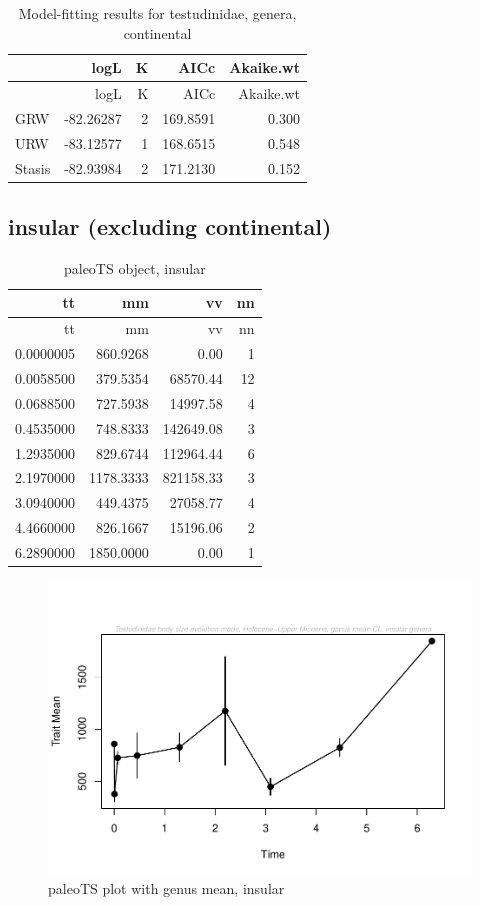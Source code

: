 \begin{longtable}[]{@{}lrrrr@{}}
	\caption{Model-fitting results for testudinidae, genera,
		continental}
	\label{tab:pTSCEM}\tabularnewline
	\toprule
	& logL & K & AICc & Akaike.wt\tabularnewline
	\midrule
	\endfirsthead
	\toprule
	& logL & K & AICc & Akaike.wt\tabularnewline
	\midrule
	\endhead
	GRW & -82.26287 & 2 & 169.8591 & 0.300\tabularnewline
	URW & -83.12577 & 1 & 168.6515 & 0.548\tabularnewline
	Stasis & -82.93984 & 2 & 171.2130 & 0.152\tabularnewline
	\bottomrule
\end{longtable}


\FloatBarrier

\subsection{insular (excluding
	continental)}\label{insular-excluding-continental}


\begin{longtable}[]{@{}rrrr@{}}
	\caption{paleoTS object, insular}
	\label{tab:pTSI}\tabularnewline
	\toprule
	tt & mm & vv & nn\tabularnewline
	\midrule
	\endfirsthead
	\toprule
	tt & mm & vv & nn\tabularnewline
	\midrule
	\endhead
	0.0000005 & 860.9268 & 0.00 & 1\tabularnewline
	0.0058500 & 379.5354 & 68570.44 & 12\tabularnewline
	0.0688500 & 727.5938 & 14997.58 & 4\tabularnewline
	0.4535000 & 748.8333 & 142649.08 & 3\tabularnewline
	1.2935000 & 829.6744 & 112964.44 & 6\tabularnewline
	2.1970000 & 1178.3333 & 821158.33 & 3\tabularnewline
	3.0940000 & 449.4375 & 27058.77 & 4\tabularnewline
	4.4660000 & 826.1667 & 15196.06 & 2\tabularnewline
	6.2890000 & 1850.0000 & 0.00 & 1\tabularnewline
	\bottomrule
\end{longtable}

\begin{figure}[htbp]
	\centering
	\includegraphics{MA_JJ_files/figure-latex/paleoTSI-1.pdf}
	\caption{paleoTS plot with genus mean, insular}
	\label{fig:pTSI}
\end{figure}

